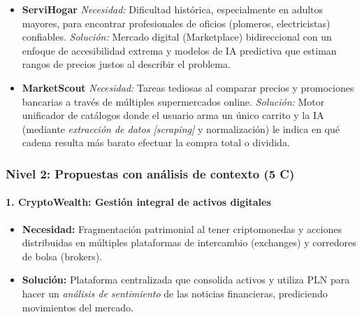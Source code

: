 \begin{itemize}
    \item \textbf{ServiHogar}
    \newline \textit{Necesidad:} Dificultad histórica, especialmente en adultos mayores, para encontrar profesionales de oficios (plomeros, electricistas) confiables.
    \newline \textit{Solución:} Mercado digital (Marketplace) bidireccional con un enfoque de accesibilidad extrema y modelos de IA predictiva que estiman rangos de precios justos al describir el problema.

    \item \textbf{MarketScout}
    \newline \textit{Necesidad:} Tareas tediosas al comparar precios y promociones bancarias a través de múltiples supermercados online.
    \newline \textit{Solución:} Motor unificador de catálogos donde el usuario arma un único carrito y la IA (mediante \textit{extracción de datos [scraping]} y normalización) le indica en qué cadena resulta más barato efectuar la compra total o dividida.
\end{itemize}

\newpage

\subsubsection{Nivel 2: Propuestas con análisis de contexto (5 C)}

\paragraph{1. CryptoWealth: Gestión integral de activos digitales}

\begin{itemize}
    \item \textbf{Necesidad:} Fragmentación patrimonial al tener criptomonedas y acciones distribuidas en múltiples plataformas de intercambio (exchanges) y corredores de bolsa (brokers).
    \item \textbf{Solución:} Plataforma centralizada que consolida activos y utiliza PLN para hacer un \textit{análisis de sentimiento} de las noticias financieras, prediciendo movimientos del mercado.
\end{itemize}

